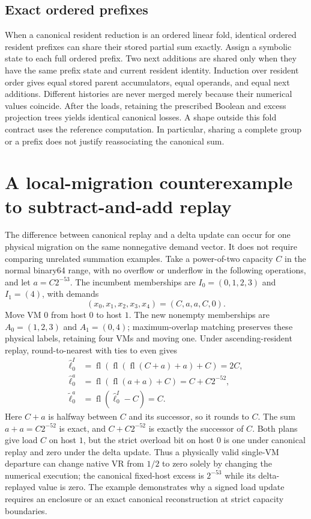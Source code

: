 \documentclass[11pt]{article}
\begin{document}
\subsection{Exact ordered prefixes}
When a canonical resident reduction is an ordered linear fold, identical ordered resident prefixes can share their stored partial sum exactly. Assign a symbolic state to each full ordered prefix. Two next additions are shared only when they have the same prefix state and current resident identity. Induction over resident order gives equal stored parent accumulators, equal operands, and equal next additions. Different histories are never merged merely because their numerical values coincide. After the loads, retaining the prescribed Boolean and excess projection trees yields identical canonical losses. A shape outside this fold contract uses the reference computation. In particular, sharing a complete group or a prefix does not justify reassociating the canonical sum.

\section{A local-migration counterexample to subtract-and-add replay}
The difference between canonical replay and a delta update can occur for one physical migration on the same nonnegative demand vector. It does not require comparing unrelated summation examples. Take a power-of-two capacity $C$ in the normal binary64 range, with no overflow or underflow in the following operations, and let $a=C2^{-53}$. The incumbent memberships are $I_0=(0,1,2,3)$ and $I_1=(4)$, with demands
\begin{equation}
 (x_0,x_1,x_2,x_3,x_4)=(C,a,a,C,0).
\end{equation}
Move VM $0$ from host $0$ to host $1$. The new nonempty memberships are $A_0=(1,2,3)$ and $A_1=(0,4)$; maximum-overlap matching preserves these physical labels, retaining four VMs and moving one. Under ascending-resident replay, round-to-nearest with ties to even gives
\begin{align}
 \widehat\ell_0^I
 &=\operatorname{fl}(\operatorname{fl}(\operatorname{fl}(C+a)+a)+C)=2C,\\
 \widehat\ell_0^a
 &=\operatorname{fl}(\operatorname{fl}(a+a)+C)=C+C2^{-52},\\
 \widetilde\ell_0^a
 &=\operatorname{fl}(\widehat\ell_0^I-C)=C.
\end{align}
Here $C+a$ is halfway between $C$ and its successor, so it rounds to $C$. The sum $a+a=C2^{-52}$ is exact, and $C+C2^{-52}$ is exactly the successor of $C$. Both plans give load $C$ on host $1$, but the strict overload bit on host $0$ is one under canonical replay and zero under the delta update. Thus a physically valid single-VM departure can change native VR from $1/2$ to zero solely by changing the numerical execution; the canonical fixed-host excess is $2^{-53}$ while its delta-replayed value is zero. The example demonstrates why a signed load update requires an enclosure or an exact canonical reconstruction at strict capacity boundaries.
\end{document}
